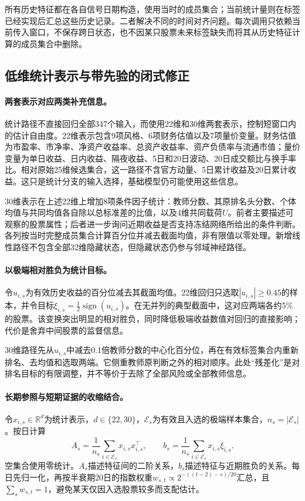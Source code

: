\documentclass[UTF8,11pt,a4paper,fontset=fandol]{ctexart}
\newcommand{\R}{\mathbb{R}}
\begin{document}
所有历史特征都在各自信号日期构造，使用当时的成员集合；当前统计量则在标签已经实现后汇总这些历史记录。二者解决不同的时间对齐问题。每次调用只依赖当前传入窗口，不保存跨日状态，也不因某只股票未来标签缺失而将其从历史特征计算的成员集合中删除。

\subsection{低维统计表示与带先验的闭式修正}\label{sec:ridge}
\paragraph{两套表示对应两类补充信息。}
统计路径不直接回归全部347个输入，而使用22维和30维两套表示，控制短窗口内的估计自由度。22维表示包含9项风格、6项财务估值以及7项量价变量。财务估值为市盈率、市净率、净资产收益率、总资产收益率、资产负债率与流通市值；量价变量为单日收益、日内收益、隔夜收益、5日和20日波动、20日成交额比与换手率比。相对原始25维候选集合，这一路径不含官方动量、5日累计收益及20日累计收益。这只是统计分支的输入选择，基础模型仍可能使用这些信息。

30维表示在上述22维上增加8项条件因子统计：教师分数、其原排名头分数、个体均值与共同均值各自除以总标准差的比值，以及4维共同载荷$U$。前者主要描述可观察的股票属性；后者进一步询问近期收益是否支持冻结网络所给出的条件判断。各列按当时完整成员集合计算百分位并减去截面均值，非有限值以零处理。新增线性路径不包含全部32维隐藏状态，但隐藏状态仍参与邻域神经路径。

\paragraph{以极端相对胜负为统计目标。}
令$u_{i,s}$为有效历史收益的百分位减去其截面均值。22维回归只选取$|u_{i,s}|\geq0.45$的样本，并令目标$\xi_{i,s}=\tfrac12\operatorname{sign}(u_{i,s})$。在无并列的典型截面中，这对应两端各约5\%的股票。该变换突出明显的相对胜负，同时降低极端收益数值对回归的直接影响；代价是舍弃中间股票的监督信息。

30维路径先从$u_{i,s}$中减去0.1倍教师分数的中心化百分位，再在有效标签集合内重新排名、去均值和选取两端。它侧重教师原判断之外的相对顺序。此处“残差化”是对排名目标的有限调整，并不等价于去除了全部风险或全部教师信息。

\paragraph{长期参照与短期证据的收缩结合。}
令$x_{i,s}\in\R^d$为统计表示，$d\in\{22,30\}$，$\mathcal E_s$为有效且入选的极端样本集合，$n_s=|\mathcal E_s|$。按日计算
\begin{equation}
 A_s=\frac1{n_s}\sum_{i\in\mathcal E_s}x_{i,s}x_{i,s}^{\top},\qquad
 b_s=\frac1{n_s}\sum_{i\in\mathcal E_s}x_{i,s}\xi_{i,s}.
 \label{eq:windowstats}
\end{equation}
空集合使用零统计。$A_s$描述特征间的二阶关系，$b_s$描述特征与近期胜负的关系。每日先归一化，再按半衰期20日的指数权重$w_{s,t}\propto2^{-((t-2)-s)/20}$汇总，且$\sum_sw_{s,t}=1$，避免某天仅因入选股票较多而支配估计。
\end{document}
